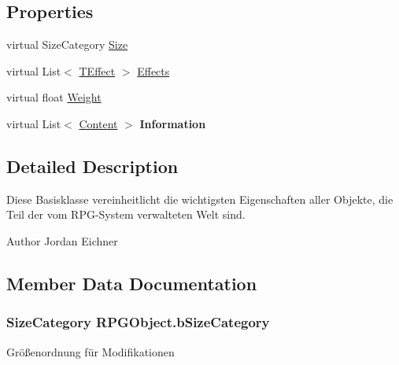 \subsection*{Properties}
\begin{DoxyCompactItemize}
\item 
virtual Size\+Category \hyperlink{class_r_p_g_object_ad4fe72a3a4621618a563219805ede17d}{Size}
\item 
virtual List$<$ \hyperlink{class_t_effect}{T\+Effect} $>$ \hyperlink{class_r_p_g_object_ac13bdb9e5988e9eff18e5f6f5b613bb6}{Effects}
\item 
virtual float \hyperlink{class_r_p_g_object_af627383d88885ca597a549cb52e4b242}{Weight}
\item 
\hypertarget{class_r_p_g_object_a312d68adaf6a8eb15319d3cac8198802}{}virtual List$<$ \hyperlink{struct_content}{Content} $>$ {\bfseries Information}\label{class_r_p_g_object_a312d68adaf6a8eb15319d3cac8198802}

\end{DoxyCompactItemize}


\subsection{Detailed Description}
Diese Basisklasse vereinheitlicht die wichtigsten Eigenschaften aller Objekte, die Teil der vom R\+P\+G-\/\+System verwalteten Welt sind. 

\begin{DoxyAuthor}{Author}
Jordan Eichner 
\end{DoxyAuthor}


\subsection{Member Data Documentation}
\hypertarget{class_r_p_g_object_ae5cb76ccbe4f37237cc03a9737009577}{}
\subsubsection[{b\+Size\+Category}]{\setlength{\rightskip}{0pt plus 5cm}Size\+Category R\+P\+G\+Object.\+b\+Size\+Category\hspace{0.3cm}{\ttfamily [protected]}}\label{class_r_p_g_object_ae5cb76ccbe4f37237cc03a9737009577}
Größenordnung für Modifikationen \hypertarget{class_r_p_g_object_a550507f127d2915aa0b7a95ef5e3feb6}{}
